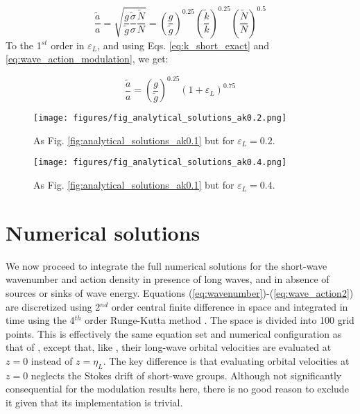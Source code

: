 \documentclass[draft]{agujournal2019}
\begin{document}
\begin{equation}
\label{eq:wave_amplitude_modulation}
\dfrac{\widetilde{a}}{a} = \sqrt{
  \dfrac{g}{\widetilde{g}}
  \dfrac{\widetilde{\sigma}}{\sigma}
  \dfrac{\widetilde{N}}{N}}
=
  \left( \dfrac{g}{\widetilde{g}} \right)^{0.25}
  \left( \dfrac{\widetilde{k}}{k} \right)^{0.25}
  \left( \dfrac{\widetilde{N}}{N} \right)^{0.5}
\end{equation}
To the 1$^{st}$ order in $\varepsilon_L$, and using Eqs. \ref{eq:k_short_exact}
and \ref{eq:wave_action_modulation}, we get:

\begin{equation}
\label{eq:wave_amplitude_modulation_order1}
\dfrac{\widetilde{a}}{a} = 
  \left( \dfrac{g}{\widetilde{g}} \right)^{0.25}
  \left( 1 + \varepsilon_L \right)^{0.75}
\end{equation}

\begin{figure}[ht]
\label{fig:analytical_solutions_ak0.2}
\centering
\texttt{[image: figures/fig\_analytical\_solutions\_ak0.2.png]}
\caption{As Fig. \ref{fig:analytical_solutions_ak0.1} but for $\varepsilon_L = 0.2$.}
\end{figure}

\begin{figure}[ht]
\label{fig:analytical_solutions_ak0.4}
\centering
\texttt{[image: figures/fig\_analytical\_solutions\_ak0.4.png]}
\caption{As Fig. \ref{fig:analytical_solutions_ak0.1} but for $\varepsilon_L = 0.4$.}
\end{figure}

\section{Numerical solutions}
\label{section:numerical_solutions}

We now proceed to integrate the full numerical solutions for the short-wave
wavenumber and action density in presence of long waves, and in absence of
sources or sinks of wave energy.
Equations (\ref{eq:wavenumber})-(\ref{eq:wave_action2}) are discretized using
2$^{nd}$  order central finite difference in space and integrated in time using the
4$^{th}$ order Runge-Kutta method \cite{butcher1996runge}.
The space is divided into 100 grid points.
This is effectively the same equation set and numerical configuration as that of
, except that, like , their
long-wave orbital velocities are evaluated at $z=0$ instead of $z=\eta_L$.
The key difference is that evaluating orbital velocities at $z=0$ neglects the
Stokes drift of short-wave groups.
Although not significantly consequential for the modulation results here, there
is no good reason to exclude it given that its implementation is trivial.
\end{document}
